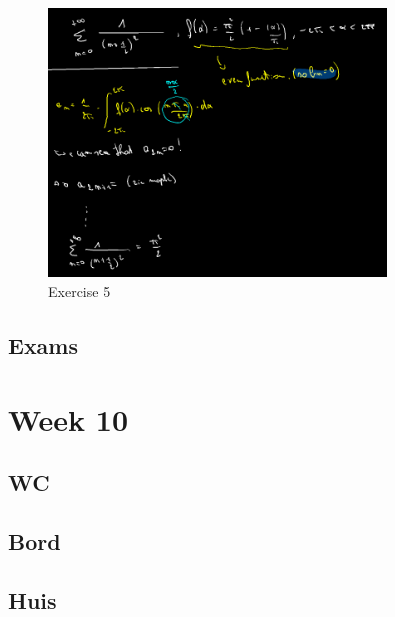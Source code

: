 \documentclass[a4paper]{report}
\begin{document}
\begin{figure}[H]
	\centering
	\includegraphics[width=0.8\textwidth]{assets/bord_9_ex_5.png}
	\caption{Exercise 5}
	\label{fig:bord_9_ex_5}
\end{figure}



\subsection{Exams}



\section{Week 10}

\subsection{WC}





\subsection{Bord}



\subsection{Huis}
\end{document}
